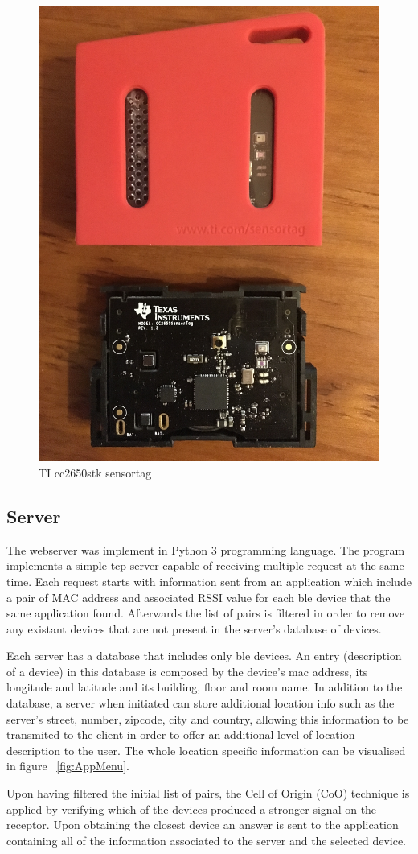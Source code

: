 \documentclass[a4paper]{IEEEtran}
\begin{document}
\begin{figure}
	\centering
		\includegraphics[width=0.5\linewidth]{figures/beacon.jpg}
	\caption[TI cc2650stk sensortag]{TI cc2650stk sensortag}
	\label{fig:beacon}
\end{figure}


\subsection{ Server}
\label{subsec:server}

The webserver was implement in Python 3 programming language. The program implements a simple tcp server capable of receiving multiple request at the same time. Each request starts with information sent from an application which include a pair of MAC address and associated RSSI value for each ble device that the same application found. Afterwards the list of pairs is filtered in order to remove any existant devices that are not present in the server's database of devices.

Each server has a database that includes only ble devices. An entry (description of a device) in this database is composed by the device's mac address, its longitude and latitude and its building, floor and room name. In addition to the database, a server when initiated can store additional location info such as the server's street, number, zipcode, city and country, allowing this information to be transmited to the client in order to offer an additional level of location description to the user. The whole location specific information can be visualised in figure ~\ref{fig:AppMenu}.

Upon having filtered the initial list of pairs, the Cell of Origin (CoO) technique is applied by verifying which of the devices produced a stronger signal on the receptor. Upon obtaining the closest device an answer is sent to the application containing all of the information associated to the server and the selected device.
\end{document}
